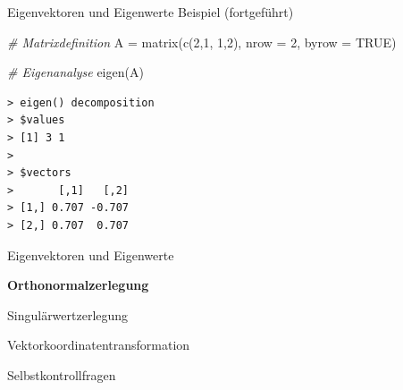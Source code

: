 \documentclass[
  8pt,
  ignorenonframetext,
]{beamer}
\newenvironment{Shaded}{\begin{snugshade}}{\end{snugshade}}
\newcommand{\AttributeTok}[1]{\textcolor[rgb]{0.77,0.63,0.00}{#1}}
\newcommand{\CommentTok}[1]{\textcolor[rgb]{0.56,0.35,0.01}{\textit{#1}}}
\newcommand{\ConstantTok}[1]{\textcolor[rgb]{0.00,0.00,0.00}{#1}}
\newcommand{\DecValTok}[1]{\textcolor[rgb]{0.00,0.00,0.81}{#1}}
\newcommand{\FunctionTok}[1]{\textcolor[rgb]{0.00,0.00,0.00}{#1}}
\newcommand{\NormalTok}[1]{#1}
\newcommand{\OtherTok}[1]{\textcolor[rgb]{0.56,0.35,0.01}{#1}}
\begin{document}
\begin{frame}[fragile]{Eigenvektoren und Eigenwerte}
\protect\hypertarget{eigenvektoren-und-eigenwerte-7}{}
Beispiel (fortgeführt) \vspace{3mm} \footnotesize

\begin{Shaded}
\begin{Highlighting}[]
\CommentTok{\# Matrixdefinition}
\NormalTok{A }\OtherTok{=} \FunctionTok{matrix}\NormalTok{(}\FunctionTok{c}\NormalTok{(}\DecValTok{2}\NormalTok{,}\DecValTok{1}\NormalTok{,}
             \DecValTok{1}\NormalTok{,}\DecValTok{2}\NormalTok{),}
           \AttributeTok{nrow  =} \DecValTok{2}\NormalTok{,}
           \AttributeTok{byrow =} \ConstantTok{TRUE}\NormalTok{)}

\CommentTok{\# Eigenanalyse}
\FunctionTok{eigen}\NormalTok{(A)}
\end{Highlighting}
\end{Shaded}

\begin{verbatim}
> eigen() decomposition
> $values
> [1] 3 1
> 
> $vectors
>       [,1]   [,2]
> [1,] 0.707 -0.707
> [2,] 0.707  0.707
\end{verbatim}
\end{frame}

\begin{frame}{}
\protect\hypertarget{section-4}{}
\vfill
{}
\Large

Eigenvektoren und Eigenwerte

\textbf{Orthonormalzerlegung}

Singulärwertzerlegung

Vektorkoordinatentransformation

Selbstkontrollfragen \vfill 
\end{frame}
\end{document}

